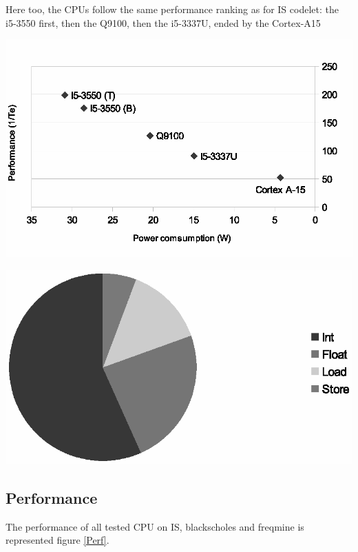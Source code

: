\documentclass{article}
\newenvironment{Figure}
  {\par\medskip\noindent\center\minipage{0.9\linewidth}}
  {\endminipage\par\bigskip\medskip}
\begin{document}
\begin{multicols}{2}
Here too, the CPUs follow the same performance ranking as for IS codelet: the i5-3550 first, then the Q9100, then the i5-3337U, ended by the Cortex-A15


\begin{Figure}
\centering
\includegraphics[width=\linewidth]{Blackscholes.eps}
\end{Figure}

\begin{Figure}
\centering
\includegraphics[width=\linewidth]{Blackscholes_instr.eps}
\end{Figure}

\subsection{Performance}
The performance of all tested CPU on IS, blackscholes and freqmine is represented figure \ref{Perf}.


\end{multicols}
\end{document}
